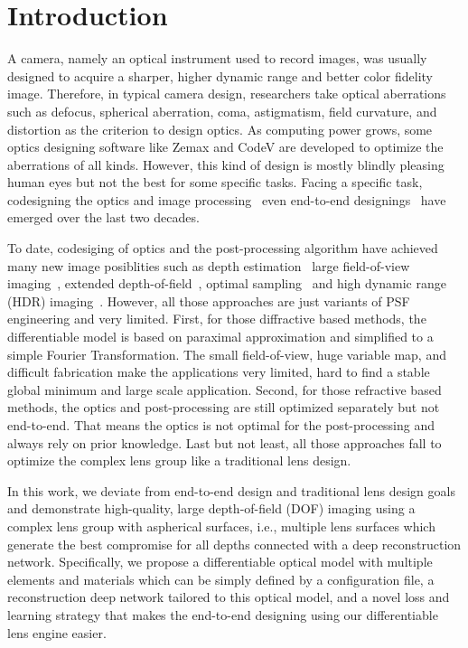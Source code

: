 \section{Introduction}
\label{sec:intro}
 A camera, namely an optical instrument used to record images, was usually designed to acquire
 a sharper, higher dynamic range and better color fidelity image. 
 Therefore, in typical camera design, researchers take optical aberrations such as defocus, spherical  
 aberration, coma, astigmatism, field curvature, and distortion as the criterion to design optics. 
 As computing power grows, some optics designing software like Zemax and CodeV are developed to
 optimize the aberrations of all kinds. 
 However, this kind of design is mostly blindly pleasing human eyes but not the best for some
 specific tasks. 
 Facing a specific task, codesigning the optics and image processing~\cite{Sun2018Depth} even 
 end-to-end designings~\cite{Sun2020LearningRank1HDR} have emerged over the last two decades. 


 To date, codesiging of optics and the post-processing algorithm have achieved many new image 
 posiblities such as  depth estimation~\cite{Chang_2019_ICCV} large field-of-view 
 imaging~\cite{Peng_Sun2019LearnLargeFOV}, extended depth-of-field~\cite{chang2019deep}, optimal
 sampling~\cite{Sun2020EndSpad} and high dynamic range (HDR) 
 imaging~\cite{Sun2020LearningRank1HDR, Metzler_2020_CVPR}. 
 However, all those approaches are just variants of PSF engineering and very limited.
 First, for those diffractive based methods, the differentiable model is based on 
 paraximal approximation and simplified to a simple Fourier Transformation. The 
 small field-of-view, huge variable map, and difficult fabrication make the 
 applications very limited, hard to find a stable global minimum and large 
 scale application. 
 Second, for those refractive based methods, the optics and post-processing are still 
 optimized separately but not end-to-end. That means the optics is not optimal for
 the post-processing and always rely on prior knowledge.
 Last but not least, all those approaches fall to optimize the complex lens group like a
 traditional lens design. 

 In this work, we deviate from end-to-end design and traditional lens design goals and demonstrate 
 high-quality, large depth-of-field (DOF) imaging using a complex lens group with aspherical surfaces, 
 i.e., multiple lens surfaces which generate the best compromise for all depths connected with a 
 deep reconstruction network. Specifically, we propose a differentiable optical model with multiple
 elements and materials	which can be simply defined by a configuration file, a reconstruction deep
 network tailored to this optical model, and a novel loss and learning strategy that makes the
 end-to-end designing using our differentiable lens engine easier. 

